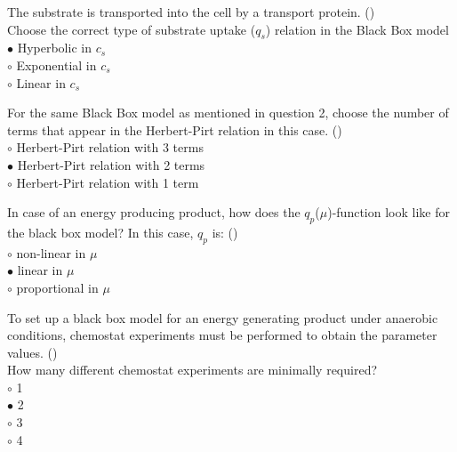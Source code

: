 \documentclass[]{beamer}
\begin{document}
\begin{frame}[shrink] {} 
\color{blue}
The substrate is transported into the cell by a  transport protein.  ({\color{green}{Q2a}})\\
Choose the correct type of substrate uptake ($q_{s}$) relation in the Black Box model\\
\color{black}
\setlength{\parindent}{-0.4cm}
{\color{red}$\bullet$}  Hyperbolic in $c_{s}$ \\
{\color{red}$\circ$}  Exponential in $c_{s}$ \\
{\color{red}$\circ$}  Linear in $c_{s}$ \\
\end{frame}


\begin{frame}[shrink] {} 
\color{blue}
For the same Black Box model as mentioned in question 2, choose the number of terms that appear in the Herbert-Pirt relation in this case. ({\color{green}{Q2b}})\\
\color{black}
\setlength{\parindent}{-0.4cm}
{\color{red}$\circ$}  Herbert-Pirt relation with 3 terms \\
{\color{red}$\bullet$}  Herbert-Pirt relation with 2 terms \\
{\color{red}$\circ$}  Herbert-Pirt relation with 1 term \\
\end{frame}


\begin{frame}[shrink] {} 
\color{blue}
In case of an energy producing product, how does the  $q_{p}$($\mu$)-function look like for the black box model? In this case, $q_{p}$ is: ({\color{green}{Q2c}})\\
\color{black}
\setlength{\parindent}{-0.4cm}
{\color{red}$\circ$}  non-linear in $\mu$ \\
{\color{red}$\bullet$}  linear in $\mu$ \\
{\color{red}$\circ$}  proportional in $\mu$ \\
\end{frame}


\begin{frame}[shrink] {} 
\color{blue}
To set up a black box model for an energy generating product under anaerobic conditions, chemostat experiments must be performed to obtain the parameter values. ({\color{green}{Q3}})\\[0.3em] 
How many different chemostat experiments are minimally required? \\
\color{black}
\setlength{\parindent}{-0.4cm}
{\color{red}$\circ$}  1 \\
{\color{red}$\bullet$}  2 \\
{\color{red}$\circ$}  3 \\
{\color{red}$\circ$}  4 \\
\end{frame}
\end{document}
